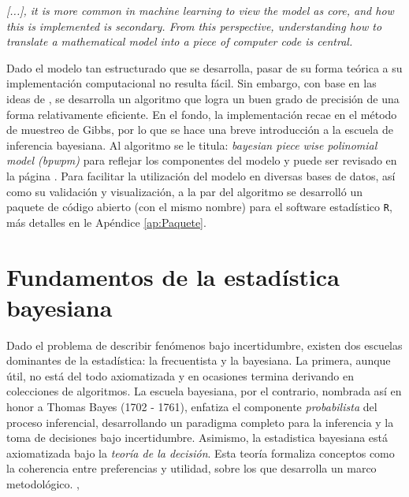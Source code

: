 \documentclass[../Main/Main.tex]{subfiles}
\begin{document}
\epigraph{\textit{[...], it is more common in machine learning to view the model as core, and how this is implemented
is secondary. From this perspective, understanding how to translate a mathematical model into a piece of
computer code is central.}}{\citet{barber2010bayesian}}

Dado el modelo tan estructurado que se desarrolla, pasar de su forma teórica a su implementación computacional no resulta fácil. Sin embargo, con base en las ideas de \citet{albert1993bayesian}, se desarrolla un algoritmo que logra un buen grado de precisión de una forma relativamente eficiente. En el fondo, la implementación recae en el método de muestreo de Gibbs, por lo que se hace una breve introducción a la escuela de inferencia bayesiana. Al algoritmo se le titula: \textit{bayesian piece wise polinomial model (bpwpm)} para reflejar los componentes del modelo y puede ser revisado en la página \pageref{alg:bpwpm}. Para facilitar la utilización del modelo en diversas bases de datos, así como su validación y visualización, a la par del algoritmo se desarrolló un paquete de código abierto (con el mismo nombre) para el software estadístico \verb|R|, más detalles en le Apéndice \ref{ap:Paquete}.

\section{Fundamentos de la estadística bayesiana}
Dado el problema de describir fenómenos bajo incertidumbre, existen dos escuelas dominantes de la estadística: la frecuentista y la bayesiana. La primera, aunque útil, no está del todo axiomatizada y en ocasiones termina derivando en colecciones de algoritmos. La escuela bayesiana, por el contrario, nombrada así en honor a Thomas Bayes (1702 - 1761), enfatiza el componente \textit{probabilista} del proceso inferencial, desarrollando un paradigma completo para la inferencia y la toma de decisiones bajo incertidumbre. Asimismo, la estadistica bayesiana está axiomatizada bajo la \textit{teoría de la decisión}. Esta teoría formaliza conceptos como la coherencia entre preferencias y utilidad, sobre los que desarrolla un marco metodológico. \autocite{mendoza2011estadistica}, \autocite{bernardo2001bayesian}
\end{document}
